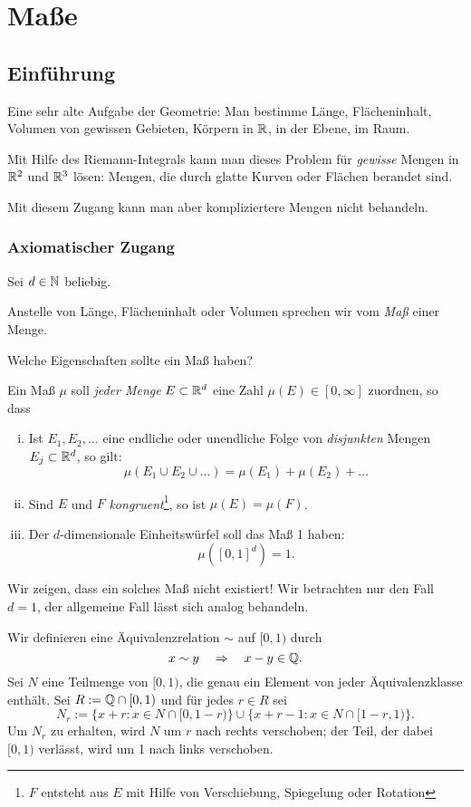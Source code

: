 \chapter{Maße}
\section{Einführung}
\begin{prgp}
 Eine sehr alte Aufgabe der Geometrie: Man bestimme Länge, Flächeninhalt,
 Volumen von gewissen Gebieten, Körpern in $\mathbb{R}$, in der Ebene, im Raum.
  
 Mit Hilfe des Riemann-Integrals kann man dieses Problem für \emph{gewisse}
 Mengen in $\mathbb{R}^2$ und $\mathbb{R}^3$ lösen: Mengen, die durch glatte Kurven oder
 Flächen berandet sind.
 
  Mit diesem Zugang kann man aber kompliziertere Mengen nicht behandeln.
\end{prgp}
 
\subsection*{Axiomatischer Zugang}
Sei $d \in \mathbb{N}$ beliebig. 

Anstelle von Länge, Flächeninhalt oder Volumen sprechen wir vom \emph{Maß} einer
Menge.

Welche Eigenschaften sollte ein Maß haben?

Ein Maß $\mu$ soll \emph{jeder Menge} $E \subset \mathbb{R}^d$ eine Zahl $\mu(E) \in
[0, \infty]$ zuordnen, so dass
\begin{enumerate}[(i)]
\item Ist $E_1, E_2, \ldots$ eine endliche oder unendliche Folge von
  \emph{disjunkten} Mengen $E_j \subset \mathbb{R}^d$, so gilt:
  \[ \mu(E_1 \cup E_2 \cup \ldots ) = \mu(E_1) + \mu(E_2) + \ldots \]
\item Sind $E$ und $F$ \emph{kongruent}\footnote{%
    $F$ entsteht aus $E$ mit Hilfe von Verschiebung, Spiegelung oder Rotation},
  so ist $\mu(E) = \mu(F)$.
\item Der $d$-dimensionale Einheitswürfel soll das Maß 1 haben:
  \[ \mu([0,1]^d) = 1. \]
\end{enumerate}

Wir zeigen, dass ein solches Maß nicht existiert! Wir betrachten nur den Fall
$d=1$, der allgemeine Fall lässt sich analog behandeln.

Wir definieren eine Äquivalenzrelation $\sim$ auf $[0,1)$ durch
\[ x \sim y \quad \Rightarrow \quad x-y \in \mathbb{Q}. \]
Sei $N$ eine Teilmenge von $[0,1)$, die genau ein Element von jeder
Äquivalenzklasse enthält. Sei $R := \mathbb{Q} \cap [0,1)$ und für jedes $r \in R$ sei
\[ N_r := \{ x + r: x \in N \cap [0,1-r) \} \cup \{ x + r - 1: x \in N \cap [1-r,1) \}. \] 
Um $N_r$ zu erhalten, wird $N$ um $r$ nach rechts verschoben; der Teil, der
dabei $[0,1)$ verlässt, wird um 1 nach links verschoben. 

